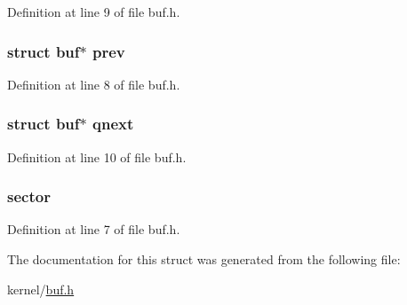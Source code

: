 Definition at line 9 of file buf.\-h.

\hypertarget{structbuf_a48c008b4a22859e25eb05af3b5c22d45}{
\subsubsection[{prev}]{\setlength{\rightskip}{0pt plus 5cm}struct {\bf buf}$\ast$ prev}}\label{structbuf_a48c008b4a22859e25eb05af3b5c22d45}


Definition at line 8 of file buf.\-h.

\hypertarget{structbuf_a479532a4750e78d1ad819ef4121f6def}{
\subsubsection[{qnext}]{\setlength{\rightskip}{0pt plus 5cm}struct {\bf buf}$\ast$ qnext}}\label{structbuf_a479532a4750e78d1ad819ef4121f6def}


Definition at line 10 of file buf.\-h.

\hypertarget{structbuf_ac4ea84582da27724e7735325dd490a92}{
\subsubsection[{sector}]{ sector}}\label{structbuf_ac4ea84582da27724e7735325dd490a92}


Definition at line 7 of file buf.\-h.



The documentation for this struct was generated from the following file\-:\begin{DoxyCompactItemize}
\item 
kernel/\hyperlink{buf_8h}{buf.\-h}\end{DoxyCompactItemize}

